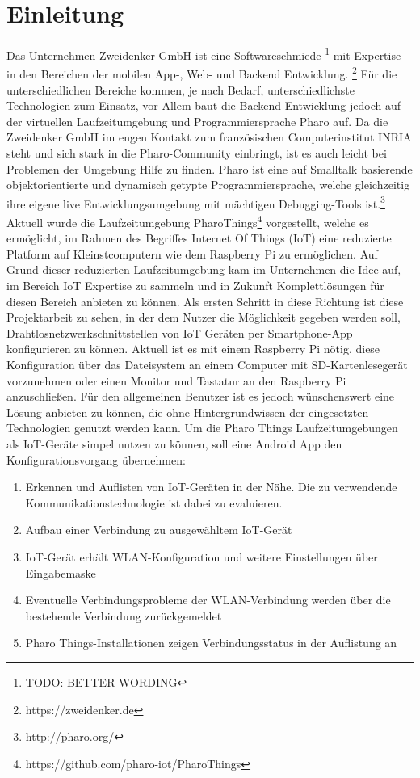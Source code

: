 \section{Einleitung}
	Das Unternehmen Zweidenker GmbH ist eine Softwareschmiede \footnote{TODO: BETTER WORDING} mit Expertise in den Bereichen der mobilen App-, Web- und Backend Entwicklung. \footnote{https://zweidenker.de}
	Für die unterschiedlichen Bereiche kommen, je nach Bedarf, unterschiedlichste Technologien zum Einsatz, vor Allem baut die Backend Entwicklung jedoch auf der virtuellen Laufzeitumgebung und Programmiersprache Pharo auf.
	Da die Zweidenker GmbH im engen Kontakt zum französischen Computerinstitut INRIA steht und sich stark in die Pharo-Community einbringt, ist es auch leicht bei Problemen der Umgebung Hilfe zu finden. 
	Pharo ist eine auf Smalltalk basierende objektorientierte und dynamisch getypte Programmiersprache,
    welche gleichzeitig ihre eigene live Entwicklungsumgebung mit mächtigen Debugging-Tools ist.\footnote{http://pharo.org/}
    Aktuell wurde die Laufzeitumgebung PharoThings\footnote{https://github.com/pharo-iot/PharoThings} vorgestellt, welche es ermöglicht, im Rahmen des Begriffes Internet Of Things (IoT) eine reduzierte Platform auf Kleinstcomputern wie dem Raspberry Pi zu ermöglichen.
    Auf Grund dieser reduzierten Laufzeitumgebung kam im Unternehmen die Idee auf, im Bereich IoT Expertise zu sammeln und in Zukunft Komplettlösungen für diesen Bereich anbieten zu können. Als ersten Schritt in diese Richtung ist diese Projektarbeit zu sehen, in der dem Nutzer die Möglichkeit gegeben werden soll, Drahtlosnetzwerkschnittstellen von IoT Geräten per Smartphone-App konfigurieren zu können. Aktuell ist es mit einem Raspberry Pi nötig, diese Konfiguration über das Dateisystem an einem Computer mit SD-Kartenlesegerät vorzunehmen oder einen Monitor und Tastatur an den Raspberry Pi anzuschließen. Für den allgemeinen Benutzer ist es jedoch wünschenswert eine Lösung anbieten zu können, die ohne Hintergrundwissen der eingesetzten Technologien genutzt werden kann.
    Um die Pharo Things Laufzeitumgebungen als IoT-Geräte simpel nutzen zu können, soll eine Android App den Konfigurationsvorgang übernehmen:
    \begin{enumerate}
        \item Erkennen und Auflisten von IoT-Geräten in der Nähe. Die zu verwendende Kommunikationstechnologie ist dabei zu evaluieren.
        \item Aufbau einer Verbindung zu ausgewähltem IoT-Gerät
        \item IoT-Gerät erhält WLAN-Konfiguration und weitere Einstellungen über Eingabemaske
        \item Eventuelle Verbindungsprobleme der WLAN-Verbindung werden über die bestehende Verbindung zurückgemeldet
        \item Pharo Things-Installationen zeigen Verbindungsstatus in der Auflistung an
    \end{enumerate}
